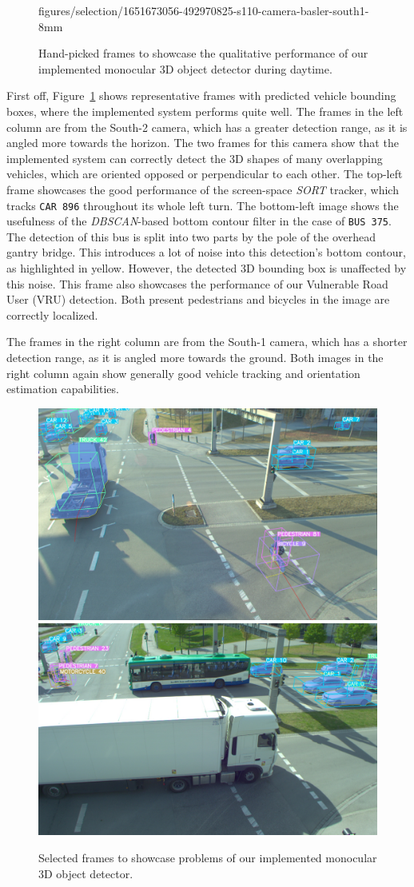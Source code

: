 \begin{figure}[htb]
{        figures/selection/1651673056-492970825-s110-camera-basler-south1-8mm}
    \caption{Hand-picked frames to showcase the qualitative performance of our implemented monocular 3D object detector during daytime.}
    \label{fig:qualitative-results-day}
\end{figure}

First off, Figure~\ref{fig:qualitative-results-day} shows representative frames with predicted vehicle bounding boxes, where the implemented system performs quite well.
The frames in the left column are from the South-2 camera, which has a greater detection range, as it is angled more towards the horizon.
The two frames for this camera show that the implemented system can correctly detect the 3D shapes of many overlapping vehicles, which are oriented opposed or perpendicular to each other.
The top-left frame showcases the good performance of the screen-space \textit{SORT} tracker, which tracks \texttt{CAR 896} throughout its whole left turn.
The bottom-left image shows the usefulness of the \textit{DBSCAN}-based bottom contour filter in the case of \texttt{BUS 375}.
The detection of this bus is split into two parts by the pole of the overhead gantry bridge.
This introduces a lot of noise into this detection's bottom contour, as highlighted in yellow.
However, the detected 3D bounding box is unaffected by this noise.
This frame also showcases the performance of our Vulnerable Road User (VRU) detection.
Both present pedestrians and bicycles in the image are correctly localized.

The frames in the right column are from the South-1 camera, which has a shorter detection range, as it is angled more towards the ground.
Both images in the right column again show generally good vehicle tracking and orientation estimation capabilities.

\begin{figure}[htb]
    \includegraphics[width=0.499\linewidth]{
        figures/selection/1646667395-641065639-s110-camera-basler-south1-8mm}
    \includegraphics[width=0.499\linewidth]{
        figures/selection/1651673050-162472285-s110-camera-basler-south1-8mm}
    \caption{Selected frames to showcase problems of our implemented monocular 3D object detector.}
    \label{fig:qualitative-results-bad}
\end{figure}

